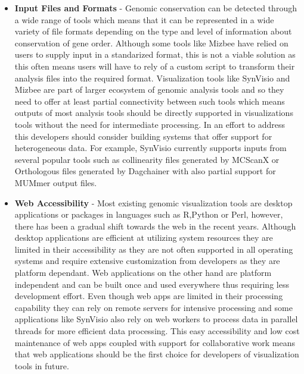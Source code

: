 \begin{itemize}
    \item \textbf{Input Files and Formats} - Genomic conservation can be detected through a wide range of tools which means that it can be represented in a wide variety of file formats depending on the type and level of information about conservation of gene order.
    Although some tools like Mizbee have relied on users to supply input in a standarized format, this is not a viable solution as this often means users will have to rely of a custom script to transform their analysis files into the required format. Visualization tools like SynVisio and Mizbee are part of larger ecosystem of genomic analysis tools and so they need to offer at least partial connectivity between such tools which means outputs of most analysis tools should be directly supported in visualizations tools without the need for intermediate processing. In an effort to address this developers should consider building systems that offer support for heterogeneous data. For example, SynVisio currently supports inputs from several popular tools such as collinearity files generated by MCScanX or Orthologous files generated by Dagchainer with also partial support for MUMmer output files. 
 
    \item \textbf{Web Accessibility} - Most existing genomic visualization tools are desktop applications or packages in languages such as R,Python or Perl, however, there has been a gradual shift towards the web in the recent years. Although desktop applications are efficient at utilizing system resources they are limited in their accessibility as they are not often supported in all operating systems and require extensive customization from developers as they are platform dependant. Web applications on the other hand are platform independent and can be built once and used everywhere thus requiring less development effort. Even though web apps are limited in their processing capability they can rely on remote servers for intensive processing and some applications like SynVisio also rely on web workers to process data in parallel threads for more efficient data processing. This easy accessibility and low cost maintenance of web apps coupled with support for collaborative work means that web applications should be the first choice for developers of visualization tools in future.
    

\end{itemize}
